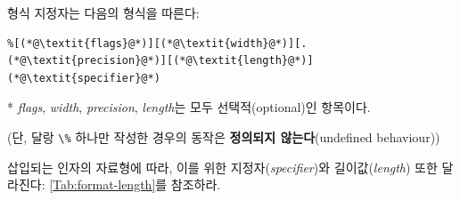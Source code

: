 \documentclass[a4paper,12pt]{book}
\newcommand{\V}[1]{\Verb|#1|}
\begin{document}
형식 지정자는 다음의 형식을 따른다:

\begin{lstlisting}
%[(*@\textit{flags}@*)][(*@\textit{width}@*)][.(*@\textit{precision}@*)][(*@\textit{length}@*)](*@\textit{specifier}@*)
\end{lstlisting}

* \textit{flags}, \textit{width}, \textit{precision}, \textit{length}는 모두 선택적(optional)인 항목이다.

(단, 달랑 \V{\%} 하나만 작성한 경우의 동작은 \textbf{정의되지 않는다}(undefined behaviour))

삽입되는 인자의 자료형에 따라, 이를 위한 지정자(\textit{specifier})와 길이값(\textit{length}) 또한 달라진다:
\autoref{Tab:format-length}를 참조하라.

\begingroup
    \centering
\end{document}
